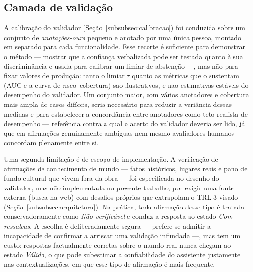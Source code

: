 \subsection{Camada de validação}

A calibração do validador (Seção~\ref{subsubsec:calibracao}) foi conduzida sobre um conjunto de \textit{anotações-ouro} pequeno e anotado por uma única pessoa, montado em separado para cada funcionalidade. Esse recorte é suficiente para demonstrar o método --- mostrar que a confiança verbalizada pode ser testada quanto à sua discriminância e usada para calibrar um limiar de abstenção ---, mas não para fixar valores de produção: tanto o limiar $\tau$ quanto as métricas que o sustentam (AUC e a curva de risco--cobertura) são ilustrativos, e não estimativas estáveis do desempenho do validador. Um conjunto maior, com vários anotadores e cobertura mais ampla de casos difíceis, seria necessário para reduzir a variância dessas medidas e para estabelecer a concordância entre anotadores como teto realista de desempenho --- referência contra a qual o acerto do validador deveria ser lido, já que em afirmações genuinamente ambíguas nem mesmo avaliadores humanos concordam plenamente entre si.

Uma segunda limitação é de escopo de implementação. A verificação de afirmações de conhecimento de mundo --- fatos históricos, lugares reais e pano de fundo cultural que vivem fora da obra --- foi especificada no desenho do validador, mas não implementada no presente trabalho, por exigir uma fonte externa (busca na web) com desafios próprios que extrapolam o TRL 3 visado (Seção~\ref{subsubsec:arquitetura}). Na prática, toda afirmação desse tipo é tratada conservadoramente como \textit{Não verificável} e conduz a resposta ao estado \textit{Com ressalvas}. A escolha é deliberadamente segura --- prefere-se admitir a incapacidade de confirmar a arriscar uma validação infundada ---, mas tem um custo: respostas factualmente corretas sobre o mundo real nunca chegam ao estado \textit{Válido}, o que pode subestimar a confiabilidade do assistente justamente nas contextualizações, em que esse tipo de afirmação é mais frequente.